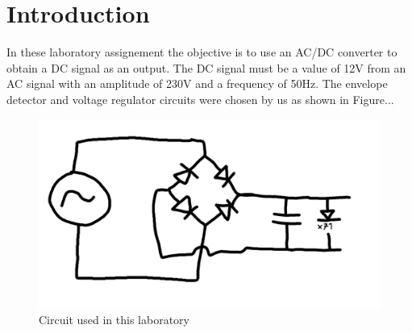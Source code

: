 \section{Introduction}
\label{sec:intro}


In these laboratory assignement the objective is to use an AC/DC converter to obtain a DC signal as an output. The DC signal must be a value of 12V from an AC signal with an amplitude of 230V and a frequency of 50Hz. The envelope detector and voltage regulator circuits were chosen by us as shown in Figure... 


\begin{figure} [!htb] 
  \includegraphics[width=\linewidth]{circuito.png}
  \caption{Circuit used in this laboratory}
  \label{fig:theoplots}
  \endminipage\hfill
\end{figure}

